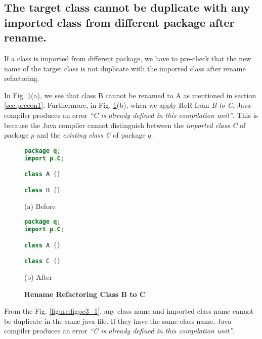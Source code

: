 \subsection{The target class cannot be duplicate with any imported class from different package after rename.}

If a class is imported from different package, we have to pre-check that the new name of the target class is not duplicate with the imported class after rename refactoring. 

In Fig. \ref{figure:fig2}(a), we see that class B cannot be renamed to A as mentioned in section \ref{sec:precon1}. Furthermore, in Fig. \ref{figure:fig2}(b), when we apply RcR from \emph{B to C}, Java compiler produces an error \textit{``C is already defined in this compilation unit''}. This is because the Java compiler cannot distinguish between the \emph{imported class C} of package $p$ and the \emph{existing class C} of package $q$. 

\begin{figure}[th]
\centering
\begin{minipage}[t]{0.4\linewidth}
\begin{lstlisting}[language=java, basicstyle=\scriptsize\ttfamily,frame=single]
package q;
import p.C;

class A {}

class B {} 
\end{lstlisting}
\centering(a) Before
\end{minipage}
\hfill
\begin{minipage}[t]{0.4\linewidth}
\begin{lstlisting}[language=java, basicstyle=\scriptsize\ttfamily,frame=single]
package q;
import p.C;

class A {}

class C {} 
\end{lstlisting}
\centering(b) After
\end{minipage}
\caption{\textbf{Rename Refactoring Class B to C}}
\label{figure:fig2}
\end{figure}


From the Fig. \ref{figure:figpc3_1}, any class name and imported class name cannot be duplicate in the same java file. If they have the same class name, Java compiler produces an error \textit{``C is already defined in this compilation unit''}.  

